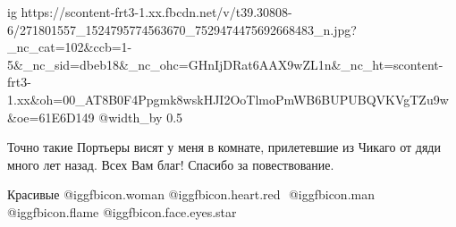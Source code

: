  
 
 
 
 


\ifcmt
  ig https://scontent-frt3-1.xx.fbcdn.net/v/t39.30808-6/271801557_1524795774563670_7529474475692668483_n.jpg?_nc_cat=102&ccb=1-5&_nc_sid=dbeb18&_nc_ohc=GHnIjDRat6AAX9wZL1n&_nc_ht=scontent-frt3-1.xx&oh=00_AT8B0F4Ppgmk8wskHJI2OoTlmoPmWB6BUPUBQVKVgTZu9w&oe=61E6D149
	@width_by 0.5
\fi


Точно такие Портьеры висят у меня в комнате, прилетевшие из Чикаго от дяди
много лет назад. Всех Вам благ! Спасибо за повествование.


Красивые  @igg{fbicon.woman} @igg{fbicon.heart.red} ️  @igg{fbicon.man}  @igg{fbicon.flame}
@igg{fbicon.face.eyes.star} 
